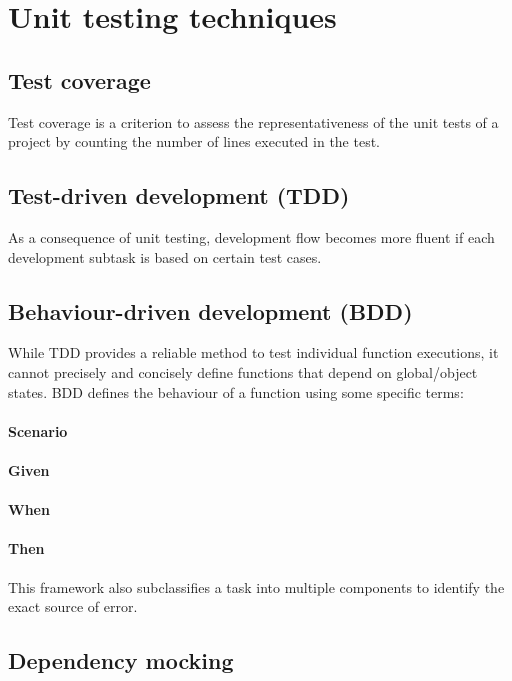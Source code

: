 \section{Unit testing techniques}
\subsection{Test coverage}
Test coverage is a criterion to assess the representativeness of the unit tests of a project by counting the number of lines executed in the test.


\subsection{Test-driven development (TDD)}
As a consequence of unit testing, development flow becomes more fluent if each development subtask is based on certain test cases.


\subsection{Behaviour-driven development (BDD)}
While TDD provides a reliable method to test individual function executions,
it cannot precisely and concisely define functions that depend on global/object states.
BDD defines the behaviour of a function using some specific terms:

\paragraph{Scenario}

\paragraph{Given}

\paragraph{When}

\paragraph{Then}

This framework also subclassifies a task into multiple components to identify the exact source of error.



\subsection{Dependency mocking}
